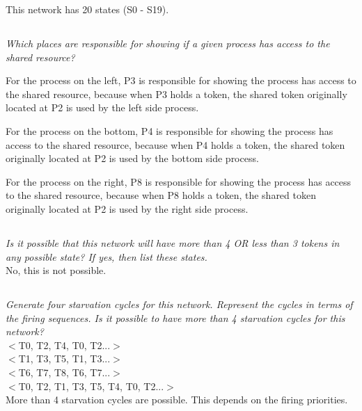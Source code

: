 \documentclass[letterpaper]{article}
\begin{document}
This network has 20 states (S0 - S19).

\subsection{}
\textit{Which places are responsible for showing if a given process has access to the shared resource?}

For the process on the left, P3 is responsible for showing the process has access
to the shared resource, because when P3 holds a token, the shared token originally
located at P2 is used by the left side process.

For the process on the bottom, P4 is responsible for showing the process has access
to the shared resource, because when P4 holds a token, the shared token originally
located at P2 is used by the bottom side process.

For the process on the right, P8 is responsible for showing the process has access
to the shared resource, because when P8 holds a token, the shared token originally
located at P2 is used by the right side process.

\subsection{}
\textit{Is it possible that this network will have more than 4 OR less than 3 tokens in any possible state?
 If yes, then list these states.
}\\

No, this is not possible.

\subsection{}
\textit{Generate four starvation cycles for this network. Represent the cycles in terms of the firing sequences. Is it possible to have more than 4 starvation cycles for this network?}\\


$<$T0, T2, T4, T0, T2...$>$\\

$<$T1, T3, T5, T1, T3...$>$\\

$<$T6, T7, T8, T6, T7...$>$\\

$<$T0, T2, T1, T3, T5, T4, T0, T2...$>$\\

More than 4 starvation cycles are possible.
This depends on the firing priorities.
\end{document}
